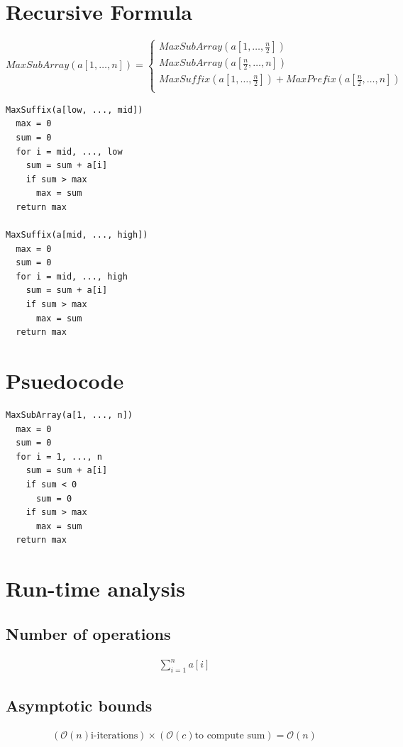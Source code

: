 \documentclass{article}
\begin{document}
\section*{Recursive Formula}

\[
  MaxSubArray(a[1, \ldots, n]) =
  \begin{cases}
      MaxSubArray\left(a[1, \ldots, \frac{n}{2}]\right)\\
      MaxSubArray\left(a[\frac{n}{2}, \ldots, n]\right)\\
      MaxSuffix\left(a[1, \ldots, \frac{n}{2}]\right) +
      MaxPrefix\left(a[\frac{n}{2}, \ldots, n]\right)\\
  \end{cases}
\]

\begin{verbatim}
MaxSuffix(a[low, ..., mid])
  max = 0
  sum = 0
  for i = mid, ..., low
    sum = sum + a[i]
    if sum > max
      max = sum
  return max

MaxSuffix(a[mid, ..., high])
  max = 0
  sum = 0
  for i = mid, ..., high
    sum = sum + a[i]
    if sum > max
      max = sum
  return max
\end{verbatim}

\section*{Psuedocode}

\begin{verbatim}
MaxSubArray(a[1, ..., n])
  max = 0
  sum = 0
  for i = 1, ..., n
    sum = sum + a[i]
    if sum < 0
      sum = 0
    if sum > max
      max = sum
  return max
\end{verbatim}

\section*{Run-time analysis}

\subsection*{Number of operations}
\begin{eqnarray*}
  \sum_{i=1}^{n}a[i]
\end{eqnarray*}

\subsection*{Asymptotic bounds}
\begin{eqnarray*}
    (\mathcal{O}(n) \text{i-iterations}) \times
    (\mathcal{O}(c) \text{to compute sum}) = \mathcal{O}(n)
\end{eqnarray*}
\end{document}
